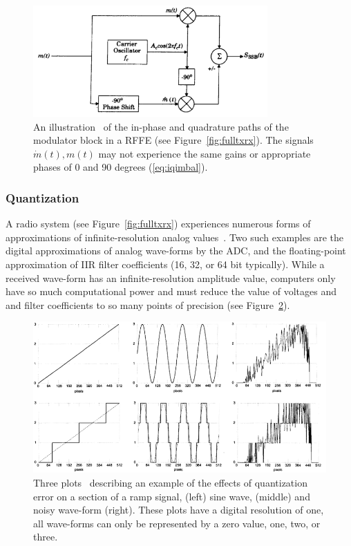 \FloatBarrier
\begin{figure}[ht!]
	\centering	\includegraphics[width=0.8\textwidth,keepaspectratio]{figs/sinecosine.png}
    \caption{An illustration~\cite{rappaport1996wireless} of the in-phase and quadrature paths of the modulator block in a RFFE (see Figure~\ref{fig:fulltxrx}). The signals $\dot{m}(t), m(t)$ may not experience the same gains or appropriate phases of 0 and 90 degrees (\ref{eq:iqimbal}).} 
\label{fig:sinecosine}      
\end{figure}
\FloatBarrier

\subsubsection{Quantization}
\label{quant}
A radio system (see Figure~\ref{fig:fulltxrx}) experiences numerous forms of approximations of infinite-resolution analog values~\cite{quant}. Two such examples are the digital approximations of analog wave-forms by the ADC, and the floating-point approximation of IIR filter coefficients (16, 32, or 64 bit typically). While a received wave-form has an infinite-resolution amplitude value, computers only have so much computational power and must reduce the value of voltages and and filter coefficients to so many points of precision (see Figure~\ref{fig:quant}).

\FloatBarrier
\begin{figure}[ht!]
	\centering	\includegraphics[width=1\textwidth,keepaspectratio]{figs/quant.png}
    \caption{Three plots~\cite{quant} describing an example of the effects of quantization error on a section of a ramp signal, (left) sine wave, (middle) and noisy wave-form (right). These plots have a digital resolution of one, all wave-forms can only be represented by a zero value, one, two, or three.} 
\label{fig:quant}      
\end{figure}
\FloatBarrier

